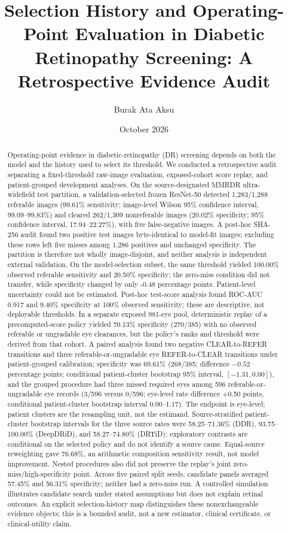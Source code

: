 \documentclass[11pt]{article}
\title{Selection History and Operating-Point Evaluation in Diabetic Retinopathy Screening: A Retrospective Evidence Audit}
\author{Burak Ata Aksu}
\date{October 2026}
\begin{document}
\maketitle
\begin{abstract}
Operating-point evidence in diabetic-retinopathy (DR) screening depends on both the model and the history used to select its threshold. We conducted a retrospective audit separating a fixed-threshold raw-image evaluation, exposed-cohort score replay, and patient-grouped development analyses. On the source-designated MMRDR ultra-widefield test partition, a validation-selected frozen ResNet-50 detected 1,283/1,288 referable images (99.61\% sensitivity; image-level Wilson 95\% confidence interval, 99.09--99.83\%) and cleared 262/1,309 nonreferable images (20.02\% specificity; 95\% confidence interval, 17.94--22.27\%), with five false-negative images. A post-hoc SHA-256 audit found two positive test images byte-identical to model-fit images; excluding these rows left five misses among 1,286 positives and unchanged specificity. The partition is therefore not wholly image-disjoint, and neither analysis is independent external validation. On the model-selection subset, the same threshold yielded 100.00\% observed referable sensitivity and 20.50\% specificity; the zero-miss condition did not transfer, while specificity changed by only -0.48 percentage points. Patient-level uncertainty could not be estimated. Post-hoc test-score analysis found ROC-AUC 0.917 and 9.40\% specificity at 100\% observed sensitivity; these are descriptive, not deployable thresholds. In a separate exposed 981-eye pool, deterministic replay of a precomputed-score policy yielded 70.13\% specificity (270/385) with no observed referable or ungradable eye clearances, but the policy's ranks and threshold were derived from that cohort. A paired analysis found two negative CLEAR-to-REFER transitions and three referable-or-ungradable eye REFER-to-CLEAR transitions under patient-grouped calibration; specificity was 69.61\% (268/385; difference $-0.52$ percentage points; conditional patient-cluster bootstrap 95\% interval, $[-1.31,0.00]$), and the grouped procedure had three missed required eyes among 596 referable-or-ungradable eye records (3/596 versus 0/596; eye-level rate difference +0.50 points, conditional patient-cluster bootstrap interval 0.00--1.17). The endpoint is eye-level; patient clusters are the resampling unit, not the estimand. Source-stratified patient-cluster bootstrap intervals for the three source rates were 58.25--71.36\% (DDR), 93.75--100.00\% (DeepDRiD), and 58.27--74.80\% (DRTiD); exploratory contrasts are conditional on the selected policy and do not identify a source cause. Equal-source reweighting gave 76.68\%, an arithmetic composition sensitivity result, not model improvement. Nested procedures also did not preserve the replay's joint zero-miss/high-specificity point. Across five paired split seeds, candidate panels averaged 57.45\% and 56.31\% specificity; neither had a zero-miss run. A controlled simulation illustrates candidate search under stated assumptions but does not explain retinal outcomes. An explicit selection-history map distinguishes these nonexchangeable evidence objects; this is a bounded audit, not a new estimator, clinical certificate, or clinical-utility claim.

\end{abstract}
\end{document}
